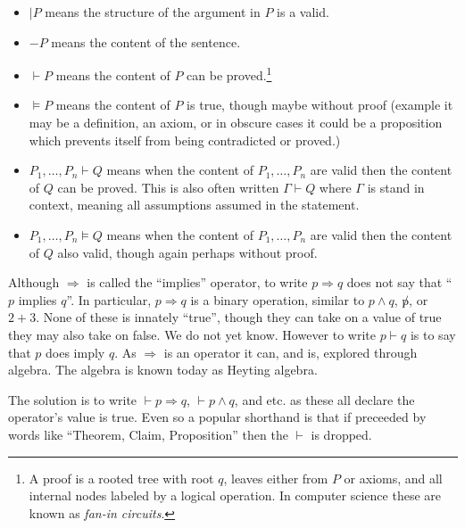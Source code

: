 \begin{itemize}
    \item $|P$ means the structure of the argument in $P$ is a valid.
    \item $-P$ means the content of the sentence.
    \item $\vdash P$ means the content of $P$ can be proved.\footnote{A proof is
    a rooted tree with root $q$, leaves either from $P$ or axioms, and all
    internal nodes labeled by a logical operation.  In computer science these
    are known as \emph{fan-in circuits}.} 
    \item $\vDash P$ means the content of $P$ is true, though maybe without proof
    (example it may be a definition, an axiom, or in obscure cases 
    it could be a proposition which prevents itself from being contradicted 
    or proved.)

    \item $P_1,\ldots,P_n \vdash Q$ means when the content of $P_1,\ldots,P_n$ are valid 
    then the content of $Q$ can be proved.  This is also often written 
    $\Gamma \vdash Q$ where $\Gamma$ is stand in context, meaning all 
    assumptions assumed in the statement.
    \item $P_1,\ldots,P_n \vDash Q$ means when the content of $P_1,\ldots,P_n$ are valid 
    then the content of $Q$ also valid, though again perhaps without proof.
\end{itemize}

\begin{remark}
    Although $\Rightarrow$ is called the ``implies'' operator, to write $p\Rightarrow q$ 
    does not say that ``$p$ implies $q$''.  In particular, $p\Rightarrow q$ 
    is a binary operation, similar to $p\wedge q$, $\not p$, or $2+3$.  None 
    of these is innately ``true'', though they can take on a value of true 
    they may also take on false.  We do not yet know.  However to write 
    $p\vdash q$ is to say that $p$ does imply $q$.  As $\Rightarrow$ is an 
    operator it can, and is, explored through algebra.  The algebra is 
    known today as Heyting algebra.

    The solution is to write $\vdash p\Rightarrow q$, $\vdash p\wedge q$, 
    and etc. as these all declare the operator's value is true.  Even so 
    a popular shorthand is that if preceeded by words like ``Theorem, Claim,
    Proposition'' then the $\vdash$ is dropped.
\end{remark}


